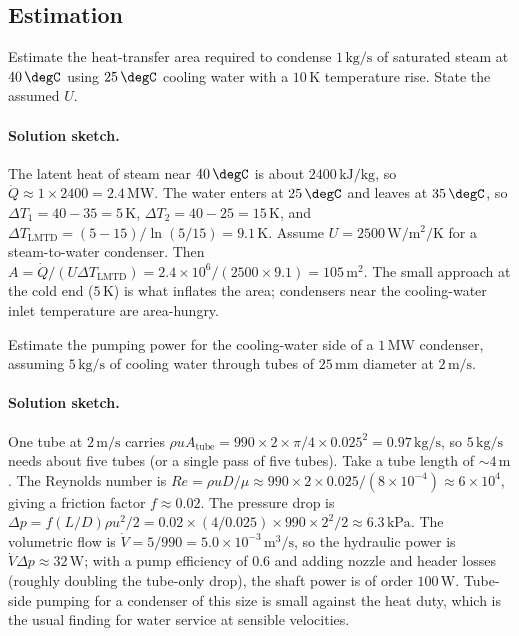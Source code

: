 \subsection*{Estimation}

\begin{exercise}
Estimate the heat-transfer area required to condense $1\,\text{kg/s}$
of saturated steam at $40\,\degC$ using $25\,\degC$ cooling water with
a $10\,\si{\kelvin}$ temperature rise. State the assumed $U$.

\paragraph{Solution sketch.} The latent heat of steam near $40\,\degC$ is
about $2400\,\text{kJ/kg}$, so $\dot{Q} \approx 1 \times 2400 = 2.4\,
\text{MW}$. The water enters at $25\,\degC$ and leaves at $35\,\degC$,
so $\Delta T_1 = 40 - 35 = 5\,\si{\kelvin}$, $\Delta T_2 = 40 - 25 =
15\,\si{\kelvin}$, and $\Delta T_{\text{LMTD}} = (5 - 15)/\ln(5/15) =
9.1\,\si{\kelvin}$. Assume $U = 2500\,\si{\watt\per\meter\squared\per
\kelvin}$ for a steam-to-water condenser. Then $A = \dot{Q}/(U \Delta
T_{\text{LMTD}}) = 2.4 \times 10^6/(2500 \times 9.1) = 105\,\text{m}^2$.
The small approach at the cold end ($5\,\si{\kelvin}$) is what inflates
the area; condensers near the cooling-water inlet temperature are
area-hungry.
\end{exercise}

\begin{exercise}
Estimate the pumping power for the cooling-water side of a $1\,\text{MW}$
condenser, assuming $5\,\text{kg/s}$ of cooling water through tubes
of $25\,\si{\milli\meter}$ diameter at $2\,\text{m/s}$.

\paragraph{Solution sketch.} One tube at $2\,\text{m/s}$ carries $\rho u
A_{\text{tube}} = 990 \times 2 \times \pi/4 \times 0.025^2 = 0.97\,
\text{kg/s}$, so $5\,\text{kg/s}$ needs about five tubes (or a single
pass of five tubes). Take a tube length of $\sim 4\,\text{m}$. The
Reynolds number is $Re = \rho u D/\mu \approx 990 \times 2 \times
0.025/(8 \times 10^{-4}) \approx 6 \times 10^4$, giving a friction
factor $f \approx 0.02$. The pressure drop is $\Delta p = f(L/D)\rho
u^2/2 = 0.02 \times (4/0.025) \times 990 \times 2^2/2 \approx 6.3\,
\text{kPa}$. The volumetric flow is $\dot{V} = 5/990 = 5.0 \times
10^{-3}\,\text{m}^3/\text{s}$, so the hydraulic power is $\dot{V}\Delta
p \approx 32\,\text{W}$; with a pump efficiency of $0.6$ and adding
nozzle and header losses (roughly doubling the tube-only drop), the
shaft power is of order $100\,\text{W}$. Tube-side pumping for a
condenser of this size is small against the heat duty, which is the
usual finding for water service at sensible velocities.
\end{exercise}

